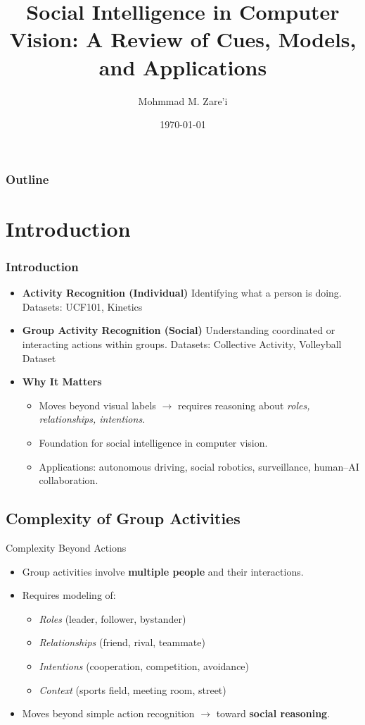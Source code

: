 \documentclass{beamer}
\title{Social Intelligence in Computer Vision: A Review of Cues, Models, and Applications}
\author{Mohmmad M. Zare'i}
\institute{University of Tehran}
\date{\today}
\begin{document}
\frame{\titlepage}
\begin{frame}
    \frametitle{Outline}
    \tableofcontents
\end{frame}


\section{Introduction}
\begin{frame}
    \frametitle{Introduction}
    \begin{itemize}
        \item \textbf{Activity Recognition (Individual)} Identifying what a person is doing.
              Datasets: UCF101, Kinetics


        \item \textbf{Group Activity Recognition (Social)} Understanding coordinated or interacting actions within groups.
              Datasets: Collective Activity, Volleyball Dataset


        \item \textbf{Why It Matters}
              \begin{itemize}
                  \item Moves beyond visual labels $\rightarrow$ requires reasoning about \textit{roles, relationships, intentions}.
                  \item Foundation for social intelligence in computer vision.
                  \item Applications: autonomous driving, social robotics, surveillance, human–AI collaboration.
              \end{itemize}
    \end{itemize}
\end{frame}

\subsection{Complexity of Group Activities}
\begin{frame}{Complexity Beyond Actions}
    \begin{itemize}
        \item Group activities involve \textbf{multiple people} and their interactions.
        \item Requires modeling of:
              \begin{itemize}
                  \item \textit{Roles} (leader, follower, bystander)
                  \item \textit{Relationships} (friend, rival, teammate)
                  \item \textit{Intentions} (cooperation, competition, avoidance)
                  \item \textit{Context} (sports field, meeting room, street)
              \end{itemize}
        \item Moves beyond simple action recognition $\rightarrow$ toward \textbf{social reasoning}.
    \end{itemize}
\end{frame}
\end{document}

